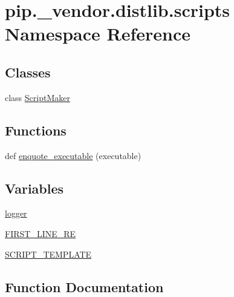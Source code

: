 \hypertarget{namespacepip_1_1__vendor_1_1distlib_1_1scripts}{}\section{pip.\+\_\+vendor.\+distlib.\+scripts Namespace Reference}
\label{namespacepip_1_1__vendor_1_1distlib_1_1scripts}
\subsection*{Classes}
\begin{DoxyCompactItemize}
\item 
class \hyperlink{classpip_1_1__vendor_1_1distlib_1_1scripts_1_1ScriptMaker}{Script\+Maker}
\end{DoxyCompactItemize}
\subsection*{Functions}
\begin{DoxyCompactItemize}
\item 
def \hyperlink{namespacepip_1_1__vendor_1_1distlib_1_1scripts_ae651fa77f908bd1843f5654ed6493cd6}{enquote\+\_\+executable} (executable)
\end{DoxyCompactItemize}
\subsection*{Variables}
\begin{DoxyCompactItemize}
\item 
\hyperlink{namespacepip_1_1__vendor_1_1distlib_1_1scripts_af65dedd6d642e54a96515997ae5b0290}{logger}
\item 
\hyperlink{namespacepip_1_1__vendor_1_1distlib_1_1scripts_a96eb6da81ea43cebf358284fa66edfc1}{F\+I\+R\+S\+T\+\_\+\+L\+I\+N\+E\+\_\+\+RE}
\item 
\hyperlink{namespacepip_1_1__vendor_1_1distlib_1_1scripts_ad0e48b7e71799879163291e8fe048f93}{S\+C\+R\+I\+P\+T\+\_\+\+T\+E\+M\+P\+L\+A\+TE}
\end{DoxyCompactItemize}


\subsection{Function Documentation}
\mbox{\label{namespacepip_1_1__vendor_1_1distlib_1_1scripts_ae651fa77f908bd1843f5654ed6493cd6}} 
